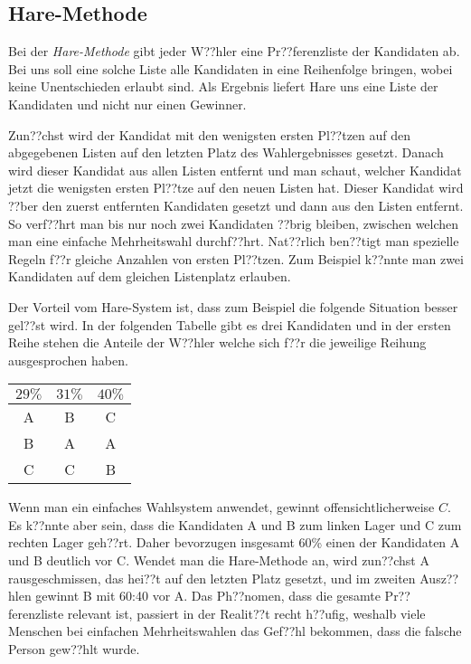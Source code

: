 \documentclass{zirkelblatt1415}
\theoremstyle{definition}
\theoremstyle{definition}
\theoremstyle{definition}
\theoremstyle{definition}
\theoremstyle{remark}
\begin{document}
\subsection{Hare-Methode}

Bei der \emph{Hare-Methode} gibt jeder W??hler eine Pr??ferenzliste der Kandidaten ab. Bei uns soll eine solche Liste alle Kandidaten in eine Reihenfolge bringen, wobei keine Unentschieden erlaubt sind. Als Ergebnis liefert Hare uns eine Liste der Kandidaten und nicht nur einen Gewinner.

Zun??chst wird der Kandidat mit den wenigsten ersten Pl??tzen auf den abgegebenen Listen auf den letzten Platz des Wahlergebnisses gesetzt. Danach wird dieser Kandidat aus allen Listen entfernt und man schaut, welcher Kandidat jetzt die wenigsten ersten Pl??tze auf den neuen Listen hat. Dieser Kandidat wird ??ber den zuerst entfernten Kandidaten gesetzt und dann aus den Listen entfernt. So verf??hrt man bis nur noch zwei Kandidaten ??brig bleiben, zwischen welchen man eine einfache Mehrheitswahl durchf??hrt. Nat??rlich ben??tigt man spezielle Regeln f??r gleiche Anzahlen von ersten Pl??tzen. Zum Beispiel k??nnte man zwei Kandidaten auf dem gleichen Listenplatz erlauben.

Der Vorteil vom Hare-System ist, dass zum Beispiel die folgende Situation besser gel??st wird. In der folgenden Tabelle gibt es drei Kandidaten und in der ersten Reihe stehen die Anteile der W??hler welche sich f??r die jeweilige Reihung ausgesprochen haben.

\begin{center}
    \begin{tabular}{ccc}
    \toprule
     $29\% $ & $31\% $ & $40\% $ \\ \midrule
    A & B & C \\[5pt]
    B & A & A \\[5pt]
    C & C & B \\
    \bottomrule
    \end{tabular}
\end{center}

Wenn man ein einfaches Wahlsystem anwendet, gewinnt offensichtlicherweise $C$. Es k??nnte aber sein, dass die Kandidaten A und B zum linken Lager und C zum rechten Lager geh??rt. Daher bevorzugen insgesamt 60\% einen der Kandidaten A und B deutlich vor C. Wendet man die Hare-Methode an, wird zun??chst A rausgeschmissen, das hei??t auf den letzten Platz gesetzt, und im zweiten Ausz??hlen gewinnt B mit 60:40 vor A. Das Ph??nomen, dass die gesamte Pr??ferenzliste relevant ist, passiert in der Realit??t recht h??ufig, weshalb viele Menschen bei einfachen Mehrheitswahlen das Gef??hl bekommen, dass die falsche Person gew??hlt wurde.
 
\end{document}
